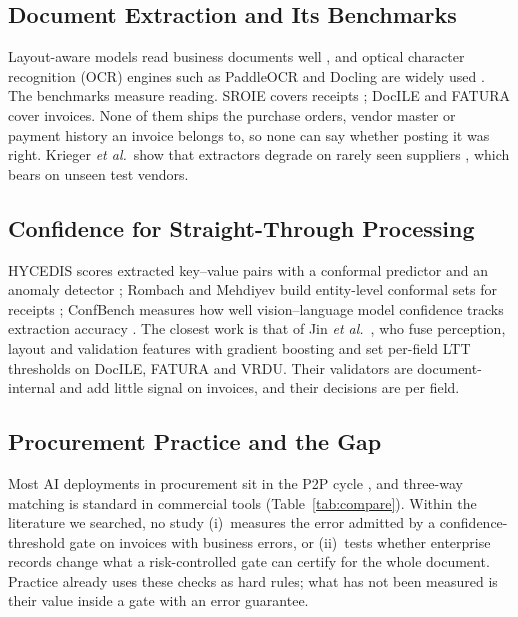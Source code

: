 \documentclass[conference]{IEEEtran}
\begin{document}
\subsection{Document Extraction and Its Benchmarks}
Layout-aware models read business documents
well \cite{huang2022layoutlmv3}, and optical character recognition (OCR) engines such as
PaddleOCR and Docling are widely used \cite{cui2025paddleocr,auer2024docling}.
The benchmarks measure reading. SROIE covers receipts \cite{huang2019sroie}; DocILE \cite{simsa2023docile} and
FATURA \cite{limam2023fatura} cover invoices. None of them ships the purchase
orders, vendor master or payment history an invoice belongs to, so none can say
whether posting it was right. Krieger \emph{et al.}\ show that extractors degrade
on rarely seen suppliers \cite{krieger2023}, which bears on unseen test vendors.

\subsection{Confidence for Straight-Through Processing}
HYCEDIS scores extracted key--value pairs with a conformal predictor and an
anomaly detector \cite{nguyen2022hycedis}; Rombach and Mehdiyev build
entity-level conformal sets for receipts \cite{rombach2026}; ConfBench measures how well
vision--language model confidence tracks extraction accuracy \cite{roy2026confbench}.
The closest work is that of Jin
\emph{et al.}~\cite{jin2026plv}, who fuse perception, layout and validation
features with gradient boosting and set per-field LTT thresholds on DocILE,
FATURA and VRDU. Their validators are document-internal and add little signal on
invoices, and their decisions are per field.

\subsection{Procurement Practice and the Gap}
Most AI deployments in procurement sit in the P2P
cycle \cite{guida2023,spreitzenbarth2024}, and three-way matching is standard in commercial
tools \cite{rossum2026rules,rossum2026mdh,sapariba2026} (Table~\ref{tab:compare}).
Within the literature we searched, no
study (i)~measures the error admitted by a confidence-threshold gate on invoices
with business errors, or (ii)~tests whether enterprise records
change what a risk-controlled gate can certify for the whole
document. Practice already uses these checks as hard rules; what has not been
measured is their value inside a gate with an error guarantee.
\end{document}
